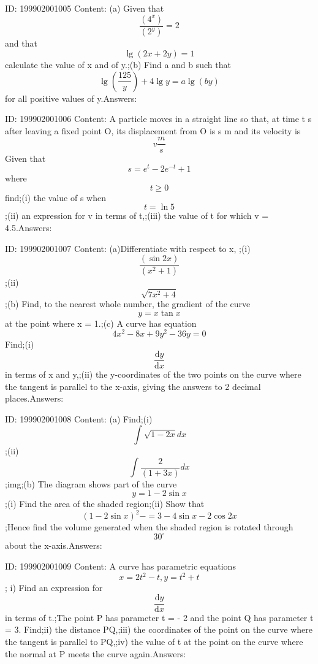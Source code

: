 \documentclass{article}
\begin{document}
ID: 199902001005
Content:
(a) Given that \[\frac{(4^x)}{(2^y)}=2\] and that \[\lg (2x + 2y) = 1\] calculate the value of x and of y.;(b)	Find a and b such that \[\lg(\frac{125}{y})+4\lg y=a\lg(by)\]  for all positive values of y.Answers:

ID: 199902001006
Content:
A particle moves in a straight line so that, at time t s after leaving a fixed point O, its displacement from O is s m and its velocity is \[v\frac{m}{s}\] Given that \[s=e^t-2e^{-t}+1\]  where \[t\geq 0\] find;(i)	the value of s when \[t = \ln 5\];(ii)	an expression for v in terms of t,;(iii)	the value of t for which v  = 4.5.Answers:

ID: 199902001007
Content:
(a)Differentiate with respect to x, ;(i) \[\frac{(\sin2x)}{(x^2+1)}\];(ii) \[\sqrt{7x^2+4}\];(b)	Find, to the nearest whole number, the gradient of the curve \[y = x \tan x \] at the point where x = 1.;(c) A curve has equation \[4x^2-8x+9y^2-36y=0\] Find;(i) \[\frac{\mathrm{d} y}{\mathrm{d} x}\]in terms of x and y,;(ii) the y-coordinates of the two points on the curve where the tangent is parallel to the x-axis, giving the answers to 2 decimal places.Answers:

ID: 199902001008
Content:
(a) Find;(i) \[\int\sqrt{1-2x}dx\] ;(ii) \[\int \frac{2}{(1+3x)}dx\];img;(b) The diagram shows part of the curve \[y = 1-2 \sin x\];(i) Find the area of the shaded region;(ii)	Show that \[(1-2\sin x)^2-=3-4\sin x-2\cos2x\] ;Hence find the volume generated when the shaded region is rotated through \[30^{\circ}\] about the x-axis.Answers:

ID: 199902001009
Content:
A curve has parametric equations \[x=2t^2-t, y=t^2+t\];  i) Find an expression for \[\frac{\mathrm{d} y}{\mathrm{d} x}\]  in terms of t.;The point P has parameter t = - 2 and the point Q has parameter t = 3. Find;ii) the distance PQ,;iii) the coordinates of the point on the curve where the tangent is parallel to PQ,;iv) the value of t at the point on the curve where the normal at P meets the curve again.Answers:
\end{document}
